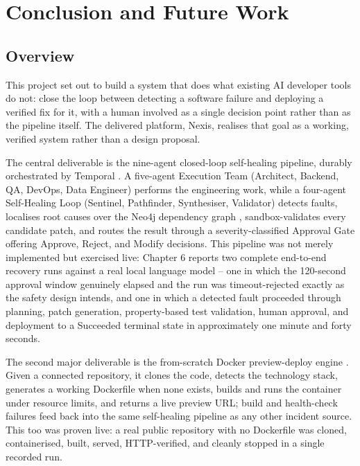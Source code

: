 \chapter{Conclusion and Future Work}

\section{Overview}

This project set out to build a system that does what existing AI developer
tools do not: close the loop between detecting a software failure and
deploying a verified fix for it, with a human involved as a single decision
point rather than as the pipeline itself. The delivered platform, Nexis,
realises that goal as a working, verified system rather than a design
proposal.

The central deliverable is the nine-agent closed-loop self-healing pipeline,
durably orchestrated by Temporal \cite{temporal}. A five-agent Execution Team
(Architect, Backend, QA, DevOps, Data Engineer) performs the engineering
work, while a four-agent Self-Healing Loop (Sentinel, Pathfinder,
Synthesiser, Validator) detects faults, localises root causes over the Neo4j
dependency graph \cite{neo4j}, sandbox-validates every candidate patch, and
routes the result through a severity-classified Approval Gate offering
Approve, Reject, and Modify decisions. This pipeline was not merely
implemented but exercised live: Chapter 6 reports two complete end-to-end
recovery runs against a real local language model \cite{ollama} -- one in
which the 120-second approval window genuinely elapsed and the run was
timeout-rejected exactly as the safety design intends, and one in which a
detected fault proceeded through planning, patch generation, property-based
test validation, human approval, and deployment to a Succeeded terminal
state in approximately one minute and forty seconds.

The second major deliverable is the from-scratch Docker preview-deploy
engine \cite{docker}. Given a connected repository, it clones the code,
detects the technology stack, generates a working Dockerfile when none
exists, builds and runs the container under resource limits, and returns a
live preview URL; build and health-check failures feed back into the same
self-healing pipeline as any other incident source. This too was proven
live: a real public repository with no Dockerfile was cloned, containerised,
built, served, HTTP-verified, and cleanly stopped in a single recorded run.

